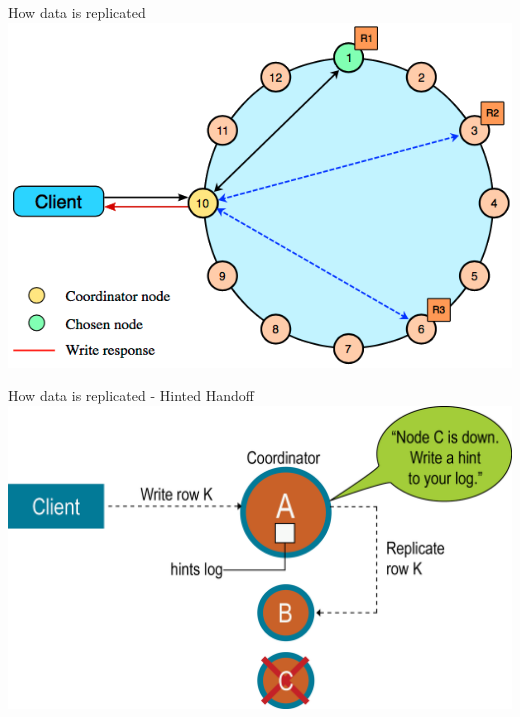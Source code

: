 \documentclass[
  10pt
]{beamer}
\begin{document}
\begin{frame}{How data is replicated \cite{cassandra_distributed_write}}
  \includegraphics[width=1.0\textwidth]{resources/distributed_write.png}

\end{frame}

\begin{frame}{How data is replicated - Hinted Handoff \cite{hinted_handoff}}
  \includegraphics[width=1.0\textwidth]{resources/hinted_handoff.png}
\end{frame}
\end{document}
